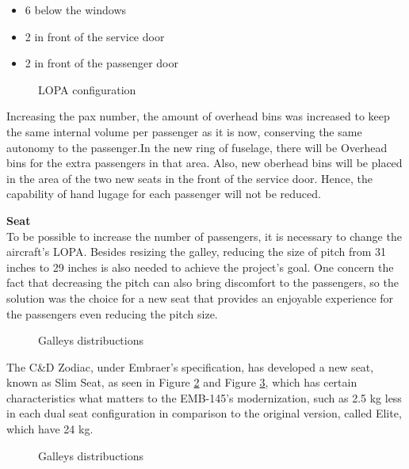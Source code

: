 \begin{itemize}
  \item 6 below the windows
  \item 2 in front of the service door
  \item 2 in front of the passenger door
\end{itemize}

\begin{figure}[H] %
\caption{LOPA configuration}
\label{fig:LOPA}
\end{figure}

Increasing the pax number, the amount of overhead bins was increased to keep the same internal volume per passenger as it is now, conserving the same autonomy to the passenger.In the new ring of fuselage, there will be Overhead bins for the extra passengers in that area. Also, new oberhead bins will be placed in the area of the two new seats in the front of the service door. Hence, the capability of hand lugage for each passenger will not be reduced.


\textbf{Seat}
\\
To be possible to increase the number of passengers, it is necessary to change the aircraft's LOPA. Besides resizing the galley, reducing the size of pitch from 31 inches to 29 inches is also needed to achieve the project's goal. One concern the fact that decreasing the pitch can also bring discomfort to the passengers, so the solution was the choice for a new seat that provides an enjoyable experience for the passengers even reducing the pitch size.

\begin{figure}[H]
\caption{Galleys distribuctions}
\label{fig:slimseatisometric}
\end{figure}

The C\&D Zodiac, under Embraer's specification, has developed a new seat, known as Slim Seat, as seen in Figure \ref{fig:slimseatisometric} and Figure \ref{fig:slimseatside}, which has certain characteristics what matters to the EMB-145's modernization, such as 2.5 kg less in each dual seat configuration in comparison to the original version, called Elite, which have 24 kg.

\begin{figure}[H]
\caption{Galleys distribuctions}
\label{fig:slimseatside}
\end{figure}


